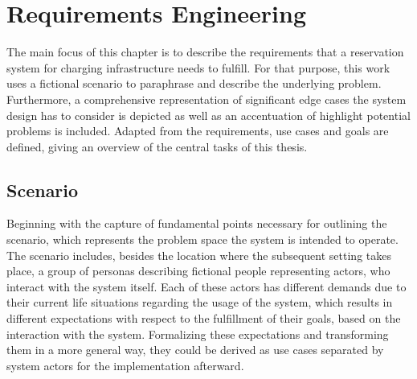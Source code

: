 
\chapter{Requirements Engineering}
\label{ch:Requirements Engineering}

The main focus of this chapter is to describe the requirements that a reservation system for charging infrastructure needs to fulfill.
For that purpose, this work uses a fictional scenario to paraphrase and describe the underlying problem. Furthermore, a comprehensive representation of significant edge cases the system design has to consider is depicted as well as an accentuation of highlight potential problems is included.
Adapted from the requirements, use cases and goals are defined, giving an overview of the central tasks of this thesis.

\section{Scenario}
\label{ch:Requirements Engineering:sec:Scenario}

Beginning with the capture of fundamental points necessary for outlining the scenario, which represents the problem space the system is intended to operate.
The scenario includes, besides the location where the subsequent setting takes place, a group of personas describing fictional people representing actors, who interact with the system itself.
Each of these actors has different demands due to their current life situations regarding the usage of the system, which results in different expectations with respect to the fulfillment of their goals, based on the interaction with the system.
Formalizing these expectations and transforming them in a more general way, they could be derived as use cases separated by system actors for the implementation afterward.

